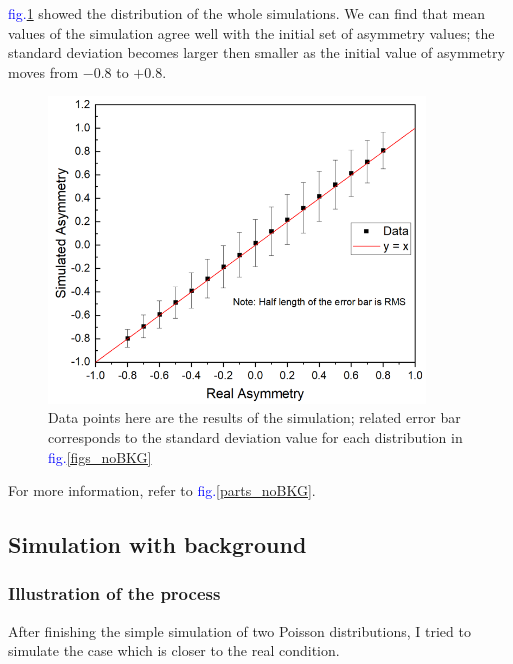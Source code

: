 \documentclass[a4paper,12pt]{article}
\begin{document}
\textcolor{blue}{fig.\ref{figure_dis_noBKG}} showed the distribution of the whole simulations. We can find that mean values of the simulation agree well with the initial set of asymmetry values; the standard deviation becomes larger then smaller as the initial value of asymmetry moves from $-0.8$ to $+0.8$.
\begin{figure}[htbp]
    \centering
    \includegraphics[width=10cm]{Images/full_noBKG.png}
    \caption{Data points here are the results of the simulation; related error bar corresponds to the standard deviation value for each distribution in \textcolor{blue}{fig.\ref{figs_noBKG}}}
    \label{figure_dis_noBKG}
\end{figure} 

For more information, refer to \textcolor{blue}{fig.\ref{parts_noBKG}}.


\subsection{Simulation with background}
\subsubsection{Illustration of the process}
After finishing the simple simulation of two Poisson distributions, I tried to simulate the case which is closer to the real condition.
\end{document}

